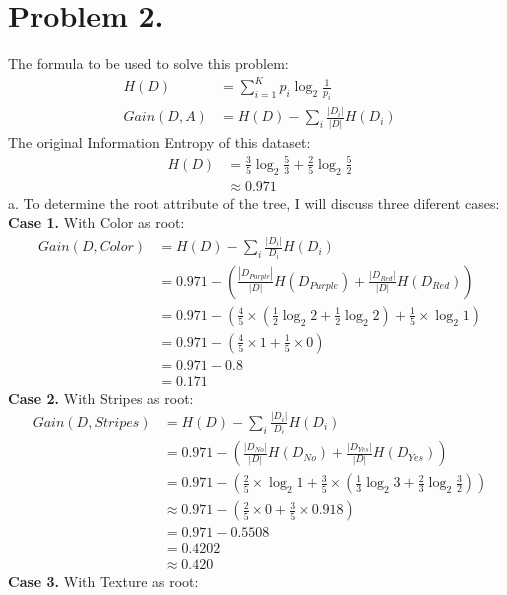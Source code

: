 \documentclass{article}
\begin{document}
    \section*{Problem 2.}
    The formula to be used to solve this problem:
    \begin{align*}
        H(D) &= \sum_{i = 1}^{K} p_i \log_{2}\frac{1}{p_i}\\
        Gain(D, A) &= H(D) - \sum_{i} \frac{|D_i|}{|D|} H(D_i)
    \end{align*}
    The original Information Entropy of this dataset:
    \begin{align*}
        H(D) &= \frac{3}{5} \log_{2}\frac{5}{3} + \frac{2}{5} \log_{2}\frac{5}{2}\\
        &\approx 0.971
    \end{align*}
    a. To determine the root attribute of the tree, I will discuss three diferent cases:\\
    \textbf{Case 1.} With Color as root:
    \begin{align*}
        Gain(D, Color) &= H(D) - \sum_{i} \frac{|D_i|}{D_i} H(D_i)\\
        &= 0.971 - (\frac{|D_{Purple}|}{|D|} H(D_{Purple}) + \frac{|D_{Red}|}{|D|} H(D_{Red}))\\
        &= 0.971 - (\frac{4}{5} \times (\frac{1}{2} \log_{2}2 + \frac{1}{2} \log_{2}2) + 
        \frac{1}{5} \times \log_{2}1)\\
        &= 0.971 - (\frac{4}{5} \times 1 + \frac{1}{5} \times 0)\\
        &= 0.971 - 0.8\\
        &= 0.171
    \end{align*}
    \textbf{Case 2.} With Stripes as root:
    \begin{align*}
        Gain(D, Stripes) &= H(D) - \sum_{i} \frac{|D_i|}{D_i} H(D_i)\\
        &= 0.971 - (\frac{|D_{No}|}{|D|} H(D_{No}) + \frac{|D_{Yes}|}{|D|} H(D_{Yes}))\\
        &= 0.971 - (\frac{2}{5} \times \log_{2}1 + \frac{3}{5} \times 
        (\frac{1}{3} \log_{2}3 + \frac{2}{3} \log_{2}\frac{3}{2}))\\
        &\approx 0.971 - (\frac{2}{5} \times 0 + \frac{3}{5} \times 0.918)\\
        &= 0.971 - 0.5508\\
        &= 0.4202\\
        &\approx 0.420
    \end{align*}
    \textbf{Case 3.} With Texture as root:
\end{document}
